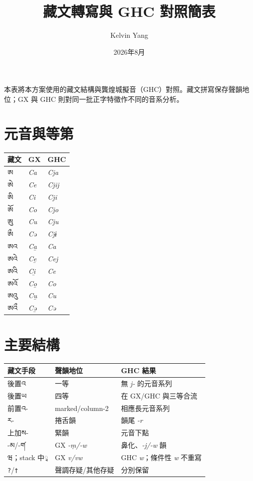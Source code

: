 \documentclass[12pt]{nextart_zh}
\title{藏文轉寫與 GHC 對照簡表}\author{Kelvin Yang}\date{2026年8月}
\begin{document}
\maketitle
本表將本方案使用的藏文結構與龔煌城擬音（GHC）對照。藏文拼寫保存聲韻地位；GX 與 GHC 則對同一批正字特徵作不同的音系分析。

\section{元音與等第}
\begin{center}\begin{tabular}{lll}\toprule 藏文 & GX & GHC \\\midrule
ཨ & \emph{Ca} & \emph{Cja} \\ ཨེ & \emph{Ce} & \emph{Cjij} \\ ཨི & \emph{Ci} & \emph{Cji} \\ ཨོ & \emph{Co} & \emph{Cjo} \\ ཨུ & \emph{Cu} & \emph{Cju} \\ ཨྀ & \emph{Cə} & \emph{Cjɨ} \\
ཨའ & \emph{Ca̱} & \emph{Ca} \\ ཨའེ & \emph{Ce̱} & \emph{Cej} \\ ཨའི & \emph{Ci̱} & \emph{Ce} \\ ཨའོ & \emph{Co̱} & \emph{Co} \\ ཨའུ & \emph{Cu̱} & \emph{Cu} \\ ཨའྀ & \emph{Cə̱} & \emph{Cə} \\\bottomrule
\end{tabular}\end{center}

\section{主要結構}
\begin{center}\small\begin{tabular}{lll}\toprule 藏文手段 & 聲韻地位 & GHC 結果 \\\midrule
後置འ & 一等 & 無 \emph{j-} 的元音系列 \\ 後置ཡ & 四等 & 在 GX/GHC 與三等合流 \\ 前置འ- & marked/column-2 & 相應長元音系列 \\ ར- & 捲舌韻 & 韻尾 \emph{-r} \\ 上加ས- & 緊韻 & 元音下點 \\ -མ/-ག༹ & GX \emph{-ṃ/-w} & 鼻化、\emph{-j/-w} 韻 \\ ཝ；stack 中ྭ & GX \emph{v/vw} & GHC \emph{w}；條件性 \emph{w} 不重寫 \\ \texttt{?}/\texttt{†} & 聲調存疑/其他存疑 & 分別保留 \\\bottomrule
\end{tabular}\end{center}
\end{document}
